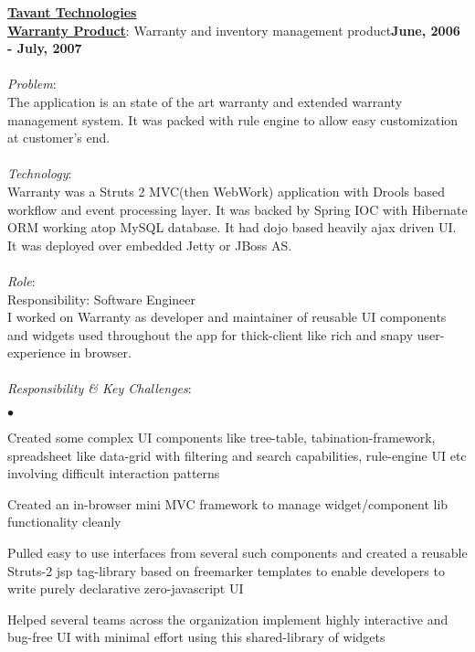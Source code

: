 \documentclass[margin,line]{res}
\newenvironment{list2}{
  \begin{list}{$\bullet$}{%
      \setlength{\itemsep}{0in}
      \setlength{\parsep}{0in} \setlength{\parskip}{0in}
      \setlength{\topsep}{0in} \setlength{\partopsep}{0in} 
      \setlength{\leftmargin}{0.2in}}}{\end{list}}
\begin{document}
\begin{resume}
{\underline {\bf Tavant Technologies}}\\
\vspace{-.1cm}
\href{http://www.tavant.com/solutions/service\_operations/warranty\_index.html}{\bf Warranty Product}: Warranty and inventory management product\hfill {\bf June, 2006 - July, 2007}\\
\vspace{-.2cm}\\
{\em Problem}:\\
The application is an state of the art warranty and extended warranty management system. It was packed with rule engine to allow easy customization at customer's end.\\
\\
{\em Technology}:\\
Warranty was a Struts 2 MVC(then WebWork) application with Drools based workflow and event processing layer. It was backed by Spring IOC with Hibernate ORM working atop MySQL database. It had dojo based heavily ajax driven UI. It was deployed over embedded Jetty or JBoss AS.\\
\\
{\em Role}: \\
Responsibility: Software Engineer\\
I worked on Warranty as developer and maintainer of reusable UI components and widgets used throughout the app for thick-client like rich and snapy user-experience in browser.\\
\\
{\em Responsibility \& Key Challenges}:

\vspace*{.05in}  
\begin{list2}
\item Created some complex UI components like tree-table, tabination-framework, spreadsheet like data-grid with filtering and search capabilities, rule-engine UI etc involving difficult interaction patterns
\item Created an in-browser mini MVC framework to manage widget/component lib functionality cleanly
\item Pulled easy to use interfaces from several such components and created a reusable Struts-2 jsp tag-library based on freemarker templates to enable developers to write purely declarative zero-javascript UI
\item Helped several teams across the organization implement highly interactive and bug-free UI with minimal effort using this shared-library of widgets
\end{list2}


\end{resume}
\end{document}
